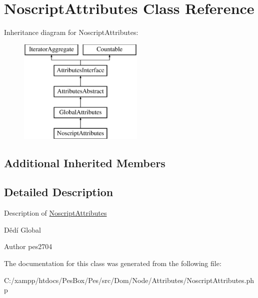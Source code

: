 \hypertarget{class_pes_1_1_dom_1_1_node_1_1_attributes_1_1_noscript_attributes}{}\section{Noscript\+Attributes Class Reference}
\label{class_pes_1_1_dom_1_1_node_1_1_attributes_1_1_noscript_attributes}
Inheritance diagram for Noscript\+Attributes\+:\begin{figure}[H]
\begin{center}
\leavevmode
\includegraphics[height=5.000000cm]{class_pes_1_1_dom_1_1_node_1_1_attributes_1_1_noscript_attributes}
\end{center}
\end{figure}
\subsection*{Additional Inherited Members}


\subsection{Detailed Description}
Description of \mbox{\hyperlink{class_pes_1_1_dom_1_1_node_1_1_attributes_1_1_noscript_attributes}{Noscript\+Attributes}}

Dědí Global

\begin{DoxyAuthor}{Author}
pes2704 
\end{DoxyAuthor}


The documentation for this class was generated from the following file\+:\begin{DoxyCompactItemize}
\item 
C\+:/xampp/htdocs/\+Pes\+Box/\+Pes/src/\+Dom/\+Node/\+Attributes/Noscript\+Attributes.\+php\end{DoxyCompactItemize}
